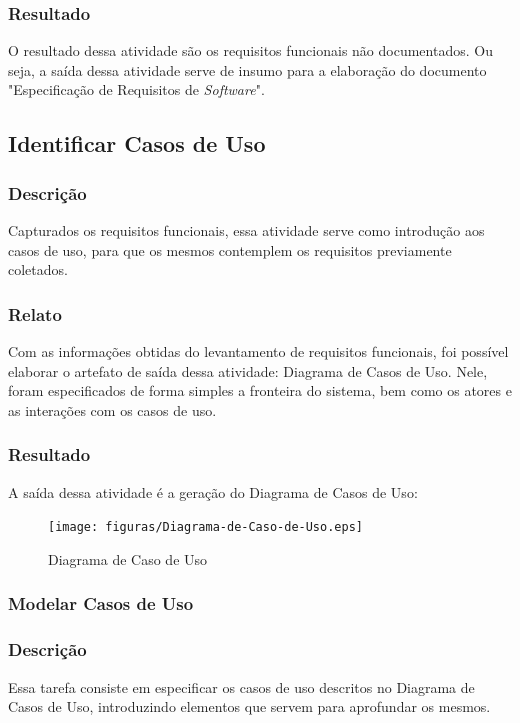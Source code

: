 \subsubsection{Resultado}
O resultado dessa atividade são os requisitos funcionais não documentados. Ou seja, a saída dessa atividade serve de insumo para a elaboração do documento "Especificação de Requisitos de \textit{Software}".

\subsection{Identificar Casos de Uso}
\subsubsection{Descrição}
  Capturados os requisitos funcionais, essa atividade serve como introdução aos casos de uso, para que os mesmos contemplem os requisitos previamente coletados.

\subsubsection{Relato}
  Com as informações obtidas do levantamento de requisitos funcionais, foi possível elaborar o artefato de saída dessa atividade: Diagrama de Casos de Uso. Nele, foram especificados de forma simples a fronteira do sistema, bem como os atores e as interações com os casos de uso.

  \clearpage{}
  
  \subsubsection{Resultado}
  A saída dessa atividade é a geração do Diagrama de Casos de Uso:

  \begin{figure}[!ht]
  	\centering
  	\label{figura_Diagrama-de-Caso-de-Uso}
  		\texttt{[image: figuras/Diagrama-de-Caso-de-Uso.eps]}
  	\caption{Diagrama de Caso de Uso}
  \end{figure}


\subsubsection{Modelar Casos de Uso}
\subsubsection{Descrição}
  Essa tarefa consiste em especificar os casos de uso descritos no Diagrama de Casos de Uso, introduzindo elementos que servem para aprofundar os mesmos.

